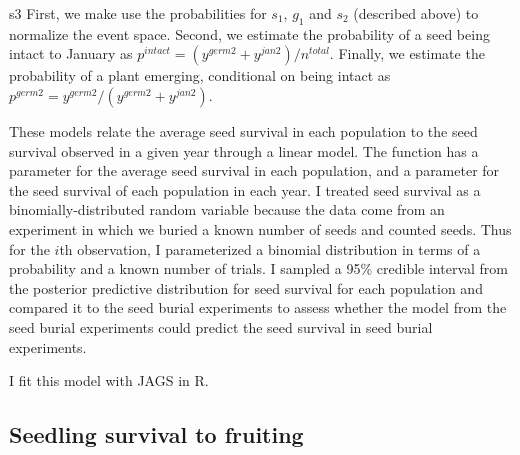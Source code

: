 \documentclass[12pt, oneside, titlepage]{article}   	%
\begin{document}
s3  First, we make use the probabilities for $s_1$, $g_1$ and $s_2$ (described above) to normalize the event space. Second, we estimate the probability of a seed being intact to January as $p^{intact} = (y^{germ2}+y^{jan2})/n^{total}$. Finally, we estimate the probability of a plant emerging, conditional on being intact as $p^{germ2} = y^{germ2}/(y^{germ2}+y^{jan2})$. 

These models relate the average seed survival in each population to the seed survival observed in a given year through a linear model. The function has a parameter for the average seed survival in each population, and a parameter for the seed survival of each population in each year. I treated seed survival as a binomially-distributed random variable because the data come from an experiment in which we buried a known number of seeds and counted seeds. Thus for the $i$th observation, I parameterized a binomial distribution in terms of a probability and a known number of trials. I sampled a 95\% credible interval from the posterior predictive distribution for seed survival for each population and compared it to the seed burial experiments to assess whether the model from the seed burial experiments could predict the seed survival in seed burial experiments. 

I fit this model with JAGS in R. %
\fi

\subsection{Seedling survival to fruiting}
\end{document}
